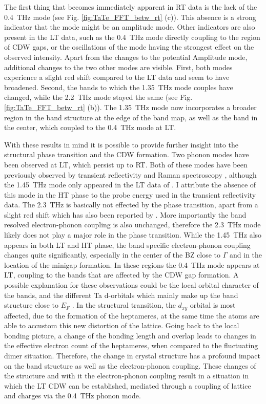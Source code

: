 The first thing that becomes immediately apparent in RT data is the lack of the \qty{0.4}{\tera\hertz} mode (see Fig. \ref{fig:TaTe_FFT_betw_rt} (c)).
This absence is a strong indicator that the mode might be an amplitude mode.
Other indicators are also present in the LT data, such as the \qty{0.4}{\tera\hertz} mode directly coupling to the region of CDW gaps, or the oscillations of the mode having the strongest effect on the observed intensity.
Apart from the changes to the potential Amplitude mode, additional changes to the two other modes are visible.
First, both modes experience a slight red shift compared to the LT data and seem to have broadened.
Second, the bands to which the \qty{1.35}{\tera\hertz} mode couples have changed, while the \qty{2.2}{\tera\hertz} mode stayed the same (see Fig. \ref{fig:TaTe_FFT_betw_rt} (b)).
The \qty{1.35}{\tera\hertz} mode now incorporates a broader region in the band structure at the edge of the band map, as well as the band in the center, which coupled to the \qty{0.4}{\tera\hertz} mode at LT.

With these results in mind it is possible to provide further insight into the structural phase transition and the CDW formation.
Two phonon modes have been observed at LT, which persist up to RT.
Both of these modes have been previously observed by transient reflectivity and Raman spectroscopy \cite{hu_optical_2022, luo_subtle_2021}, although the \qty{1.45}{\tera\hertz} mode only appeared in the LT data of \cite{hu_optical_2022}.
I attribute the absence of this mode in the HT phase to the probe energy used in the transient reflectivity data.
The \qty{2.3}{\tera\hertz} is basically not effected by the phase transition, apart from a slight red shift which has also been reported by \cite{hu_optical_2022, luo_subtle_2021}.
More importantly the band resolved electron-phonon coupling is also unchanged, therefore the \qty{2.3}{\tera\hertz} mode likely does not play a major role in the phase transition.
While the \qty{1.45}{\tera\hertz} also appears in both LT and HT phase, the band specific electron-phonon coupling changes quite significantly, especially in the center of the BZ close to $\Gamma$ and in the location of the minigap formation.
In these regions the \qty{0.4}{\tera\hertz} mode appears at LT, coupling to the bands that are affected by the CDW gap formation.
A possible explanation for these observations could be the local orbital character of the bands, and the different Ta d-orbitals which mainly make up the band structure close to $E_F$ \cite{mitsuishi_unveiling_2024}.
In the structural transition, the  $d_{xy}$ orbital is most affected, due to the formation of the heptameres, at the same time the  atoms are able to accustom this new distortion of the lattice.
Going back to the local bonding picture, a change of the bonding length and overlap leads to changes in the effective electron count of the heptameres, when compared to the fluctuating dimer situation.
Therefore, the change in crystal structure has a profound impact on the band structure as well as the electron-phonon coupling.
These changes of the structure and with it the electron-phonon coupling result in a situation in which the LT CDW can be established, mediated through a coupling of lattice and charges via the \qty{0.4}{\tera\hertz} phonon mode.

